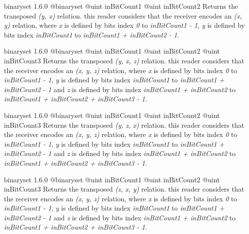 {binaryset}
{1.6.0}
{@binaryset}
{@uint inBitCount1}
{@uint inBitCount2}
{Returns the transposed \emph{(y, x)} relation.}
{this reader considers that the receiver encodes an \emph{(x, y)} relation, where \emph{x} is defined by bits index \emph{0} to \emph{inBitCount1  - 1}, \emph{y} is defined by bits index \emph{inBitCount1} to \emph{inBitCount1 + inBitCount2 - 1}.}







{binaryset}
{1.6.0}
{@binaryset}
{@uint inBitCount1}
{@uint inBitCount2}
{@uint inBitCount3}
{Returns the transposed \emph{(y, x, z)} relation.}
{this reader considers that the receiver encodes an \emph{(x, y, z)} relation, where \emph{x} is defined by bits index \emph{0} to \emph{inBitCount1  - 1}, \emph{y} is defined by bits index \emph{inBitCount1} to \emph{inBitCount1 + inBitCount2 - 1} and  \emph{z} is defined by bits index \emph{inBitCount1 + inBitCount2} to \emph{inBitCount1 + inBitCount2 + inBitCount3 - 1}.}







{binaryset}
{1.6.0}
{@binaryset}
{@uint inBitCount1}
{@uint inBitCount2}
{@uint inBitCount3}
{Returns the transposed \emph{(y, z, x)} relation.}
{this reader considers that the receiver encodes an \emph{(x, y, z)} relation, where \emph{x} is defined by bits index \emph{0} to \emph{inBitCount1  - 1}, \emph{y} is defined by bits index \emph{inBitCount1} to \emph{inBitCount1 + inBitCount2 - 1} and  \emph{z} is defined by bits index \emph{inBitCount1 + inBitCount2} to \emph{inBitCount1 + inBitCount2 + inBitCount3 - 1}.}







{binaryset}
{1.6.0}
{@binaryset}
{@uint inBitCount1}
{@uint inBitCount2}
{@uint inBitCount3}
{Returns the transposed \emph{(z, x, y)} relation.}
{this reader considers that the receiver encodes an \emph{(x, y, z)} relation, where \emph{x} is defined by bits index \emph{0} to \emph{inBitCount1  - 1}, \emph{y} is defined by bits index \emph{inBitCount1} to \emph{inBitCount1 + inBitCount2 - 1} and  \emph{z} is defined by bits index \emph{inBitCount1 + inBitCount2} to \emph{inBitCount1 + inBitCount2 + inBitCount3 - 1}.}







